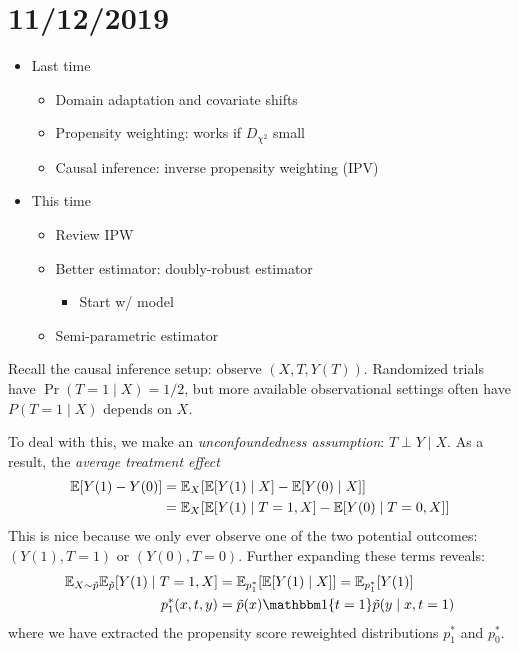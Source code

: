 \section{11/12/2019}

\begin{itemize}
  \item Last time
    \begin{itemize}
      \item Domain adaptation and covariate shifts
      \item Propensity weighting: works if $D_{\chi^2}$ small
      \item Causal inference: inverse propensity weighting (IPV)
    \end{itemize}
  \item This time
    \begin{itemize}
    	\item Review IPW
	\item Better estimator: doubly-robust estimator
	  \begin{itemize}
	  	\item Start w/ model
	  \end{itemize}
	\item Semi-parametric estimator
    \end{itemize}
\end{itemize}

Recall the causal inference setup: observe $(X,T, Y(T))$.
Randomized trials have $\Pr(T=1 \mid X) = 1/2$, but more available
observational settings often have $P(T=1 \mid X)$ depends on $X$.

To deal with this, we make an \emph{unconfoundedness assumption}:
$T \perp Y \mid X$. As a result, the \emph{average treatment effect}
\begin{align}
  \mathbb{E}[Y(1) - Y(0)]
  &= \mathbb{E}_X[\mathbb{E}[Y(1) \mid X] - \mathbb{E}[Y(0) \mid X]] \\
  &= \mathbb{E}_X[\mathbb{E}[Y(1) \mid T=1, X] - \mathbb{E}[Y(0) \mid T=0, X]]
\end{align}
This is nice because we only ever observe one of the two potential
outcomes: $(Y(1), T=1)$ or $(Y(0), T=0)$.
Further expanding these terms reveals:
\begin{align}
  \ex_{X \sim \tilde{p}} \ex_{\tilde{p}}[ Y(1) \mid T=1, X]
  &= \ex_{p_1^*}[\ex[ Y(1) \mid X]]
  = \ex_{p_1^*}[Y(1)]\\
  p_1^*(x, t, y) &= \tilde{p}(x) \ind\{t=1\} \tilde{p}(y \mid x, t=1)
\end{align}
where we have extracted the propensity score reweighted
distributions $p_1^*$ and $p_0^*$.

